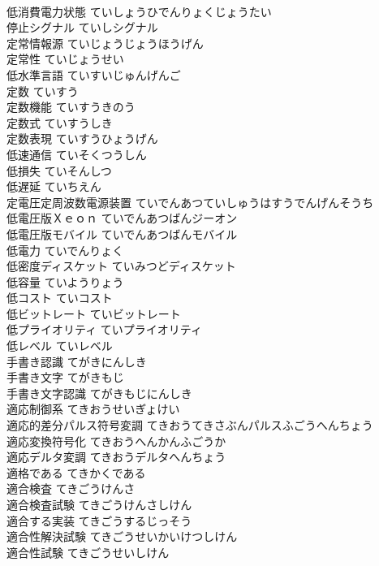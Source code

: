 \documentclass[8pt]{extreport}
\begin{document}
\begin{CJK}{UTF8}{min}
\\	低消費電力状態	ていしょうひでんりょくじょうたい	
\\	停止シグナル	ていしシグナル	
\\	定常情報源	ていじょうじょうほうげん	
\\	定常性	ていじょうせい	
\\	低水準言語	ていすいじゅんげんご	
\\	定数	ていすう	
\\	定数機能	ていすうきのう	
\\	定数式	ていすうしき	
\\	定数表現	ていすうひょうげん	
\\	低速通信	ていそくつうしん	
\\	低損失	ていそんしつ	
\\	低遅延	ていちえん	
\\	定電圧定周波数電源装置	ていでんあつていしゅうはすうでんげんそうち	
\\	低電圧版Ｘｅｏｎ	ていでんあつばんジーオン	
\\	低電圧版モバイル	ていでんあつばんモバイル	
\\	低電力	ていでんりょく	
\\	低密度ディスケット	ていみつどディスケット	
\\	低容量	ていようりょう	
\\	低コスト	ていコスト	
\\	低ビットレート	ていビットレート	
\\	低プライオリティ	ていプライオリティ	
\\	低レベル	ていレベル	
\\	手書き認識	てがきにんしき	
\\	手書き文字	てがきもじ	
\\	手書き文字認識	てがきもじにんしき	
\\	適応制御系	てきおうせいぎょけい	
\\	適応的差分パルス符号変調	てきおうてきさぶんパルスふごうへんちょう	
\\	適応変換符号化	てきおうへんかんふごうか	
\\	適応デルタ変調	てきおうデルタへんちょう	
\\	適格である	てきかくである	
\\	適合検査	てきごうけんさ	
\\	適合検査試験	てきごうけんさしけん	
\\	適合する実装	てきごうするじっそう	
\\	適合性解決試験	てきごうせいかいけつしけん	
\\	適合性試験	てきごうせいしけん	

\end{CJK}
\end{document}
